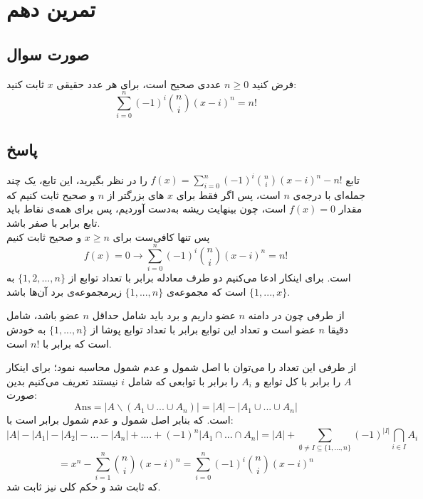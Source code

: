 \documentclass[12pt,a4paper]{article}
\begin{document}
\section{تمرین دهم}
\subsection{صورت سوال}
فرض کنید 
$n \geq 0$
عددی صحیح است، برای هر عدد حقیقی $x$ ثابت کنید:
\[
\sum_{i = 0}^n (-1)^i \binom{n}{i} (x-i)^n = n!
\]
\subsection{پاسخ}
تابع 
$f(x) = \sum_{i = 0}^n (-1)^i \binom{n}{i} (x-i)^n - n!$
را در نظر بگیرید، این تابع، یک چند جمله‌ای با درجه‌ی $n$ است، پس اگر فقط برای $x$ های بزرگتر از $n$ و صحیح ثابت کنیم که مقدار 
 $f(x) = 0$ 
 است، چون بینهایت ریشه به‌دست آوردیم، پس برای همه‌ی نقاط باید تابع برابر با صفر باشد.
 \\
 پس تنها کافی‌ست برای 
 $x \geq n$
 و صحیح ثابت کنیم 
\[f(x) = 0 \rightarrow \sum_{i=0}^n (-1)^i \binom{n}{i} (x-i)^n = n!\]
 است. برای اینکار ادعا می‌کنیم دو طرف معادله برابر با تعداد توابع از 
 $\{1, 2, ..., n\}$
 به
 $\{1, ..., x\}$
 است که مجموعه‌ی 
 $\{1, ..., n\}$
 زیرمجموعه‌ی برد آن‌ها باشد.
 
از طرفی چون در دامنه $n$ عضو داریم و برد باید شامل حداقل $n$ عضو باشد، شامل دقیقا $n$ عضو است و تعداد این توابع برابر با تعداد توابع پوشا از 
$\{1, ..., n\}$
به خودش است که برابر با 
$n!$
است.

از طرفی این تعداد را می‌توان با اصل شمول و عدم شمول محاسبه نمود؛
برای اینکار $A$ را برابر با کل توابع و 
$A_i$
را برابر با توابعی که شامل $i$ نیستند تعریف می‌کنیم بدین صورت:
\[
\text{Ans} = |A \backslash (A_1 \cup ... \cup A_n)| = |A| - |A_1 \cup ... \cup A_n|
\]
است. که بنابر اصل شمول و عدم شمول برابر است با:
\[
|A| - |A_1| - |A_2| - ... - |A_n| + .... + (-1)^n |A_1 \cap ... \cap A_n|
= |A| + \sum_{\emptyset \neq I \subseteq \{1, ..., n\}} (-1)^{|I|} \bigcap_{i\in I} A_i
\]
\[
= x^n - \sum_{i = 1}^n \binom{n}{i}(x-i)^n = \sum_{i=0}^n (-1)^i\binom{n}{i}(x-i)^n
\]
که ثابت شد و حکم کلی نیز ثابت شد.
\end{document}

